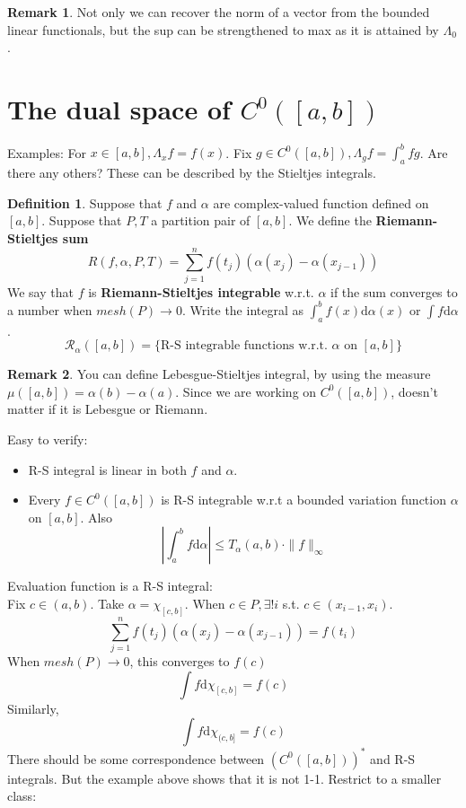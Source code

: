 \documentclass{article}
\theoremstyle{definition}
\newtheorem{dfn}{Definition}
\newtheorem{rem}{Remark}
\begin{document}
\begin{rem}
	Not only we can recover the norm of a vector from the bounded linear functionals, but the sup can be strengthened to max as it is attained by $\Lambda_0$.
\end{rem}


\section{The dual space of $C^0([a, b])$}


\par Examples: For $x \in [a, b], \Lambda_x f = f(x)$.
Fix $g \in C^0([a, b]), \Lambda_g f = \int_a^b fg$.
Are there any others?
These can be described by the Stieltjes integrals.

\begin{dfn}
	Suppose that $f$ and $\alpha$ are complex-valued function defined on $[a, b]$.
	Suppose that $P, T$ a partition pair of $[a, b]$.
	We define the \textbf{Riemann-Stieltjes sum}
	\[
		R(f, \alpha, P, T) = \sum_{j = 1}^n f(t_j) (\alpha (x_j) - \alpha(x_{j - 1}))
	\]
	We say that $f$ is \textbf{Riemann-Stieltjes integrable} w.r.t. $\alpha$ if the sum converges to a number when $mesh(P) \to 0$.
	Write the integral as $\int_a^b f(x) \mathrm{d} \alpha(x)$ or $\int f \mathrm{d} \alpha$.
	\[
		\mathcal{R}_\alpha([a, b]) = \{\text{R-S integrable functions w.r.t. }\alpha \text{ on } [a, b] \}
	\]
\end{dfn}

\begin{rem}
	You can define Lebesgue-Stieltjes integral, by using the measure $\mu([a, b]) = \alpha (b) - \alpha(a)$.
	Since we are working on $C^0([a, b])$, doesn't matter if it is Lebesgue or Riemann.
\end{rem}

Easy to verify: 
\begin{itemize}
	\item R-S integral is linear in both $f$ and $\alpha$.
		
	\item Every $f \in C^0([a, b])$ is R-S integrable w.r.t a bounded variation function $\alpha$ on $[a, b]$.
		Also
		\[
			\left|\int_a^b f \mathrm{d} \alpha \right| \leq T_\alpha(a, b) \cdot \|f \|_{\infty}
		\]
\end{itemize}

Evaluation function is a R-S integral:\\
Fix $c \in (a, b)$.
Take $\alpha = \chi_{[c, b]}$.
When $c \in P, \exists ! i$ s.t. $c \in (x_{i - 1}, x_i)$.
\[
	\sum_{j =1}^n f(t_j)(\alpha(x_j) - \alpha(x_{j - 1})) = f(t_i)
\]
When $mesh(P) \to 0$, this converges to $f(c)$
\[
	\int f \mathrm{d} \chi_{[c, b]} = f(c)
\]
Similarly, 
\[
	\int f \mathrm{d} \chi_{(c, b]} = f(c)
\]
There should be some correspondence between $(C^0([a, b]))^*$ and R-S integrals.
But the example above shows that it is not 1-1.
Restrict to a smaller class:
\end{document}
